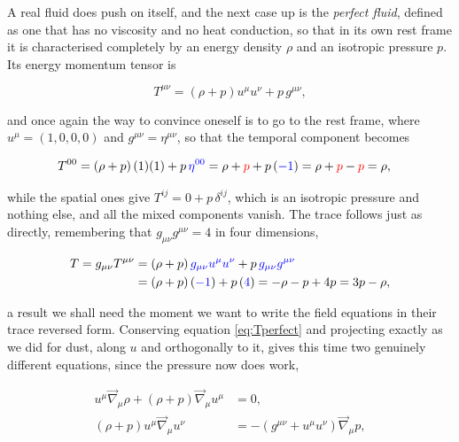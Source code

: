         A real fluid does push on itself, and the next case up is the \textit{perfect fluid}, defined as one that has no viscosity and no heat conduction, so that in its own rest frame it is characterised completely by an energy density $\rho$ and an isotropic pressure $p$. Its energy momentum tensor is

        \begin{equation}\label{eq:Tperfect}
            T^{\mu\nu} = \left(\rho + p\right)u^{\mu}u^{\nu} + p\,g^{\mu\nu},
        \end{equation}

        and once again the way to convince oneself is to go to the rest frame, where $u^{\mu}=(1,0,0,0)$ and $g^{\mu\nu}=\eta^{\mu\nu}$, so that the temporal component becomes

        \begin{align*}
            T^{00} &= \left(\rho+p\right)(1)(1) + p\,{\color{blue}\eta^{00}} = \rho + {\color{red}p} + p\left({\color{blue}-1}\right) = \rho + {\color{red}p} - {\color{red}p} = \rho,
        \end{align*}

        while the spatial ones give $T^{ij} = 0 + p\,\delta^{ij}$, which is an isotropic pressure and nothing else, and all the mixed components vanish. The trace follows just as directly, remembering that $g_{\mu\nu}g^{\mu\nu}=4$ in four dimensions,

        \begin{align*}
            T = g_{\mu\nu}T^{\mu\nu} &= \left(\rho+p\right){\color{blue}g_{\mu\nu}u^{\mu}u^{\nu}} + p\,{\color{blue}g_{\mu\nu}g^{\mu\nu}}\\
            &= \left(\rho+p\right)\left({\color{blue}-1}\right) + p\left({\color{blue}4}\right) = -\rho - p + 4p = 3p - \rho,
        \end{align*}

        a result we shall need the moment we want to write the field equations in their trace reversed form. Conserving equation \ref{eq:Tperfect} and projecting exactly as we did for dust, along $u$ and orthogonally to it, gives this time two genuinely different equations, since the pressure now does work,

        \begin{align}
            u^{\mu}\Vec{\nabla}_{\mu}\rho + \left(\rho+p\right)\Vec{\nabla}_{\mu}u^{\mu} &= 0,\\
            \left(\rho+p\right)u^{\mu}\Vec{\nabla}_{\mu}u^{\nu} &= -\left(g^{\mu\nu}+u^{\mu}u^{\nu}\right)\Vec{\nabla}_{\mu}p,
        \end{align}

